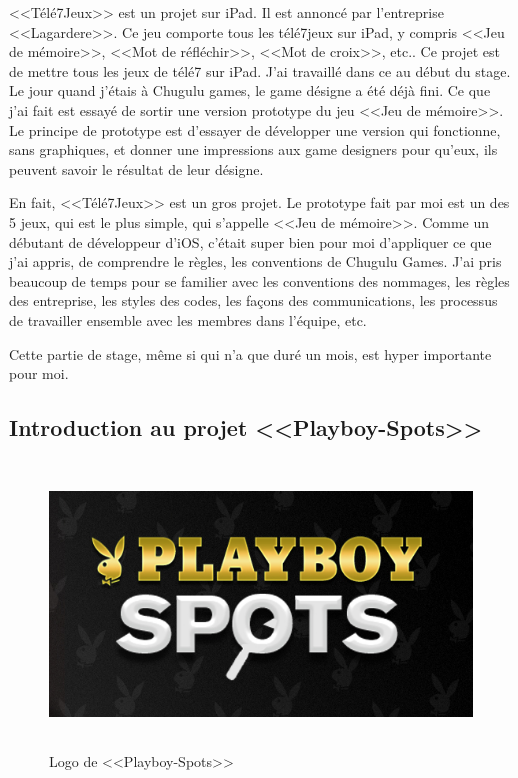 <<Télé7Jeux>> est un projet sur iPad. Il est annoncé par l'entreprise <<Lagardere>>. Ce jeu comporte tous les télé7jeux sur iPad, y compris <<Jeu de mémoire>>, <<Mot de réfléchir>>, <<Mot de croix>>, etc.. Ce projet est de mettre tous les jeux de télé7 sur iPad.
J'ai travaillé dans ce au début du stage. Le jour quand j'étais à Chugulu games, le game désigne a été déjà fini. Ce que j'ai fait est essayé de sortir une version prototype du jeu <<Jeu de mémoire>>. Le principe de prototype est d'essayer de développer une version qui fonctionne, sans graphiques, et donner une impressions aux game designers pour qu'eux, ils peuvent savoir le résultat de leur désigne. 

En fait, <<Télé7Jeux>> est un gros projet. Le prototype fait par moi est un des 5 jeux, qui est le plus simple, qui s'appelle <<Jeu de mémoire>>. Comme un débutant de développeur d'iOS, c'était super bien pour moi d'appliquer ce que j'ai appris, de comprendre le règles, les conventions de Chugulu Games. J'ai pris beaucoup de temps pour se familier avec les conventions des nommages, les règles des entreprise, les styles des codes, les façons des communications, les processus de travailler ensemble avec les membres dans l'équipe, etc. 

Cette partie de stage, même si qui n'a que duré un mois, est hyper importante pour moi.


\subsection{Introduction au projet <<Playboy-Spots>>} %
\label{ssub:introduction_au_projet_playboy_s}

\begin{figure}[htbp]
	\centering
		\includegraphics[height=3in]{Image/logoPlayboy.png}
	\caption{Logo de <<Playboy-Spots>>}
	\label{fig:Image_logoPlayboy}
\end{figure}



